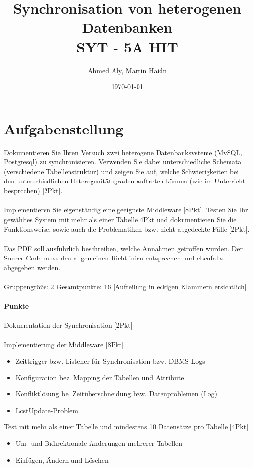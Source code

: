 \documentclass[a4paper]{article}
\author{Ahmed Aly, Martin Haidn}
\title{Synchronisation von heterogenen Datenbanken\\SYT - 5A HIT}
\date{\today}
\begin{document}
	\maketitle
	\tableofcontents
	
	\newpage
	\section{Aufgabenstellung}
	Dokumentieren Sie Ihren Versuch zwei heterogene Datenbanksysteme (MySQL, Postgresql) zu synchronisieren. Verwenden Sie dabei unterschiedliche Schemata (verschiedene Tabellenstruktur) und zeigen Sie auf, welche Schwierigkeiten bei den unterschiedlichen Heterogenitätsgraden auftreten können (wie im Unterricht besprochen) [2Pkt].\\
	\\
	Implementieren Sie eigenständig eine geeignete Middleware [8Pkt]. Testen Sie Ihr gewähltes System mit mehr als einer Tabelle 4Pkt und dokumentieren Sie die Funktionsweise, sowie auch die Problematiken bzw. nicht abgedeckte Fälle [2Pkt].\\
	\\
	Das PDF soll ausführlich beschreiben, welche Annahmen getroffen wurden. Der Source-Code muss den allgemeinen Richtlinien entsprechen und ebenfalls abgegeben werden.\\
	\\
	Gruppengröße: 2 Gesamtpunkte: 16 [Aufteilung in eckigen Klammern ersichtlich]\\
	\\
	\textbf{Punkte}\\
	\\
	Dokumentation der Synchronisation [2Pkt]\\
	\\
	Implementierung der Middleware [8Pkt]
	\begin{itemize}
		\item Zeittrigger bzw. Listener für Synchronisation bzw. DBMS Logs
		\item Konfiguration bez. Mapping der Tabellen und Attribute
		\item Konfliktlösung bei Zeitüberschneidung bzw. Datenproblemen (Log)
		\item LostUpdate-Problem\\
	\end{itemize}
	
	Test mit mehr als einer Tabelle und mindestens 10 Datensätze pro Tabelle [4Pkt]
	\begin{itemize}
		\item Uni- und Bidirektionale Änderungen mehrerer Tabellen
		\item Einfügen, Ändern und Löschen\\
	\end{itemize}
	
\end{document}
